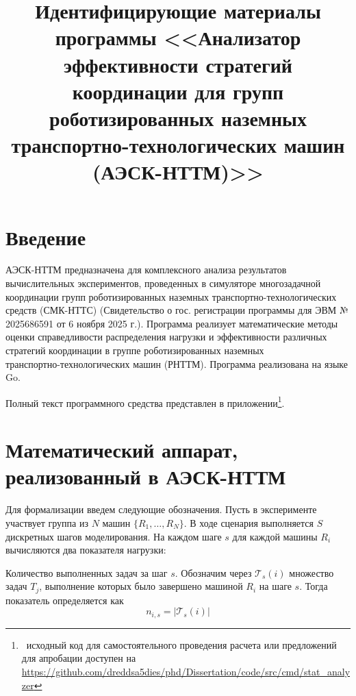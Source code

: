 

\title{Идентифицирующие материалы программы <<Анализатор эффективности стратегий координации для групп роботизированных наземных транспортно-технологических машин (АЭСК-НТТМ)>>}



\maketitle

\section{Введение}

АЭСК-НТТМ предназначена для комплексного анализа результатов вычислительных экспериментов, проведенных в симуляторе многозадачной координации групп роботизированных наземных транспортно-технологических средств (СМК-НТТС) (Свидетельство о гос. регистрации программы для ЭВМ № 2025686591 от 6 ноября 2025 г.). Программа реализует математические методы оценки справедливости распределения нагрузки и эффективности различных стратегий координации в группе роботизированных наземных \\ транспортно-технологических машин (РНТТМ). Программа реализована на языке Go.

Полный текст программного средства представлен в приложении\footnote{\  исходный код для самостоятельного проведения расчета или предложений для апробации доступен на \url{https://github.com/dreddsa5dies/phd/Dissertation/code/src/cmd/stat_analyzer}}.

\section{Математический аппарат, \\ реализованный в АЭСК-НТТМ}

Для формализации введем следующие обозначения. Пусть в эксперименте участвует группа из $N$ машин $\{R_1, \dots, R_N\}$. В ходе сценария выполняется $S$ дискретных шагов моделирования. На каждом шаге $s$ для каждой машины $R_i$ вычисляются два показателя нагрузки:

Количество выполненных задач за шаг $s$. Обозначим через $\mathcal{T}_s(i)$ множество задач $T_j$, выполнение которых было завершено машиной $R_i$ на шаге $s$. Тогда показатель определяется как
\begin{equation}
	n_{i,s} = | \mathcal{T}_s(i) |
\end{equation}

